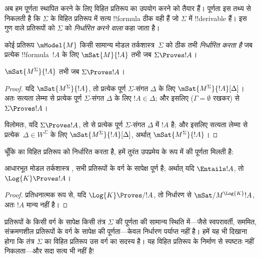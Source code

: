 \documentclass[../../../include/open-logic-section]{subfiles}
\begin{document}


अब हम पूर्णता स्थापित करने के लिए विहित प्रतिरूप का उपयोग करने को तैयार
हैं। पूर्णता इस तथ्य से निकलती है कि $\Sigma$ के विहित प्रतिरूप में सत्य
!!{formula} ठीक वही हैं जो $\Sigma$ में !!{derivable} हैं। इस गुण वाले
प्रतिरूपों को $\Sigma$ को \emph{निर्धारित करने वाला} कहा जाता है।

\begin{defn}
  कोई प्रतिरूप $\mModel{M}$ किसी सामान्य मोडल तर्कशास्त्र~$\Sigma$ को
  ठीक तभी \emph{निर्धारित करता है} जब प्रत्येक !!{formula}~$!A$ के लिए
  $\mSat{M}{!A}$ तभी जब $\Sigma \Proves !A$।
\end{defn}

\begin{thm}[निर्धारण]
   $\mSat{M^\Sigma}{!A}$ तभी जब $\Sigma \Proves !A$।
\end{thm}

\begin{proof}
  यदि $\mSat{M^\Sigma}{!A}$, तो प्रत्येक पूर्ण $\Sigma$-संगत $\Delta$
  के लिए $\mSat{M^\Sigma}{!A}[\Delta]$। अतः सत्यता लेम्मा से प्रत्येक
  पूर्ण $\Sigma$-संगत $\Delta$ के लिए $!A \in \Delta$; और इसलिए
   ($\Gamma = \emptyset$
  रखकर) से $\Sigma \Proves !A$।

  विलोमतः, यदि $\Sigma \Proves !A$, तो
   से प्रत्येक
  पूर्ण $\Sigma$-संगत $\Delta$ में $!A$ है; और इसलिए सत्यता लेम्मा से
  प्रत्येक~$\Delta \in W^\Sigma$ के लिए
  $\mSat{M^\Sigma}{!A}[\Delta]$, अर्थात् $\mSat{M^\Sigma}{!A}$।
\end{proof}

चूँकि  का विहित प्रतिरूप  को निर्धारित करता है, हमें तुरंत
उपप्रमेय के रूप में  की पूर्णता मिलती है:

\begin{cor}
  आधारभूत मोडल तर्कशास्त्र , सभी प्रतिरूपों के वर्ग के सापेक्ष
  पूर्ण है; अर्थात् यदि $\Entails !A$, तो $\Log{K} \Proves !A$।
\end{cor}

\begin{proof}
  प्रतिधनात्मक रूप से, यदि $\Log{K} \Proves/ !A$, तो निर्धारण से
  $\mSat/{M^{\Log{K}}}{!A}$, अतः $!A$ मान्य नहीं है।
\end{proof}

प्रतिरूपों के किसी वर्ग के सापेक्ष किसी तंत्र $\Sigma$ की पूर्णता की
सामान्य स्थिति में---जैसे स्वपरावर्ती, सममित, संक्रमणशील प्रतिरूपों के
वर्ग के सापेक्ष  की पूर्णता---केवल निर्धारण पर्याप्त नहीं है।
हमें यह भी दिखाना होगा कि तंत्र $\Sigma$ का विहित प्रतिरूप उस वर्ग का
सदस्य है। यह विहित प्रतिरूप के निर्माण से स्पष्टतः नहीं निकलता---और सदा
सत्य भी नहीं है!
\end{document}
